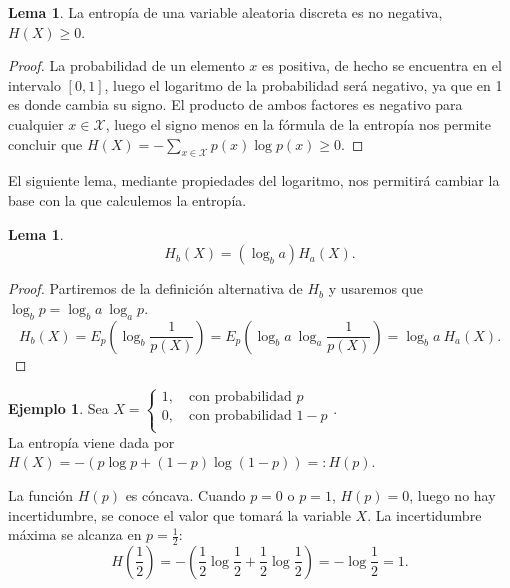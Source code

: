 \documentclass[10pt,a4paper]{article} %
\theoremstyle{definition}
\newtheorem{lemma}[theorem]{Lema}
\newtheorem{example}[theorem]{Ejemplo}
\begin{document}
\begin{lemma} La entropía de una variable aleatoria discreta es no negativa, $H(X) \ge 0$.
\end{lemma}
\begin{proof}
  La probabilidad de un elemento $x$ es positiva, de hecho se encuentra en el intervalo $[0,1]$, luego el logaritmo de la probabilidad será negativo, ya que en 1 es donde cambia su signo. El producto de ambos factores es negativo para cualquier $x \in \mathcal{X}$, luego el signo menos en la fórmula de la entropía nos permite concluir que $H(X) = - \sum_{x \in \mathcal{X}}p(x)\log p(x) \ge 0$.
\end{proof}

El siguiente lema, mediante propiedades del logaritmo, nos permitirá cambiar la base con la que calculemos la entropía.

\begin{lemma}\[H_b(X) = (\log_ba) H_a(X).\]
\end{lemma}
\begin{proof}
  Partiremos de la definición alternativa de $H_b$ y usaremos que $\log_bp = \log_ba\ \log_ap$.
  \[
  H_b(X) = E_p \left(\log_b \frac{1}{p(X)}\right ) = E_p \left ( \log_b a\ \log_a \frac{1}{p(X)} \right ) = \log_b{a}\ H_a(X).
  \]
\end{proof}

\begin{example}
  Sea $X = 
     \begin{cases}
       1, \quad\text{con probabilidad } p\\
       0, \quad\text{con probabilidad } 1-p \\
     \end{cases}.$\\
     La entropía viene dada por $H(X) = - \left ( p \log p + (1-p) \log (1-p) \right ) =: H(p)$.

     La función $H(p)$ es cóncava. Cuando $p=0$ o $p=1$, $H(p) = 0$, luego no hay incertidumbre, se conoce el valor que tomará la variable $X$. La incertidumbre máxima se alcanza en $p=\frac{1}{2}$: \[H\left (\frac{1}{2}\right ) = - \left ( \frac{1}{2}\log\frac{1}{2} + \frac{1}{2} \log\frac{1}{2} \right ) = - \log \frac{1}{2} = 1.\]

\end{example}
\end{document}
